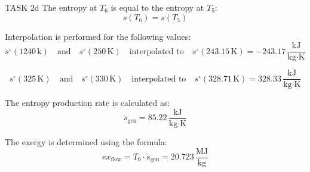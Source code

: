 TASK 2d  
The entropy at \( T_6 \) is equal to the entropy at \( T_5 \):  
\[
s(T_6) = s(T_5)
\]

Interpolation is performed for the following values:  
\[
s^\circ(1240 \, \text{k}) \quad \text{and} \quad s^\circ(250 \, \text{K}) \quad \text{interpolated to} \quad s^\circ(243.15 \, \text{K}) = -243.17 \, \frac{\text{kJ}}{\text{kg·K}}
\]

\[
s^\circ(325 \, \text{K}) \quad \text{and} \quad s^\circ(330 \, \text{K}) \quad \text{interpolated to} \quad s^\circ(328.71 \, \text{K}) = 328.33 \, \frac{\text{kJ}}{\text{kg·K}}
\]

The entropy production rate is calculated as:  
\[
\dot{s}_{\text{gen}} = 85.22 \, \frac{\text{kJ}}{\text{kg·K}}
\]

The exergy is determined using the formula:  
\[
ex_{\text{flow}} = T_0 \cdot \dot{s}_{\text{gen}} = 20.723 \, \frac{\text{MJ}}{\text{kg}}
\]
